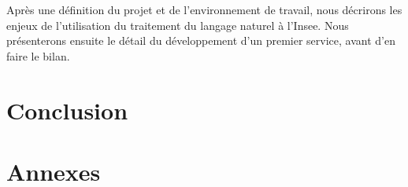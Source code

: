 \documentclass[11pt, oneside, a4paper, titlepage, french]{article}
\begin{document}
Après une définition du projet et de l'environnement de travail, nous décrirons les enjeux de l'utilisation du traitement du langage naturel à l'Insee. Nous présenterons ensuite le détail du développement d'un premier service, avant d'en faire le bilan.
\newpage


\newpage

\newpage

\newpage

\newpage

\section*{Conclusion}
\newpage


\section*{Annexes}
\end{document}
